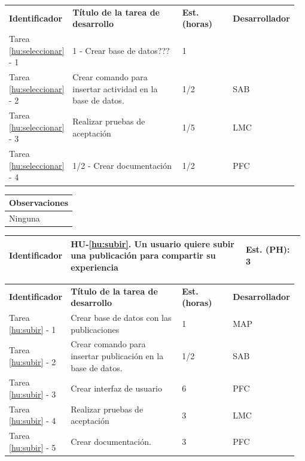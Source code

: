 \documentclass[11pt]{article}
\begin{document}
\begin{longtable}{p{0.18\linewidth}|p{0.4\linewidth}|p{0.18\linewidth}|p{0.2\linewidth}}
	\toprule
	\textbf{Identificador} & \textbf{Título de la tarea de desarrollo} & \textbf{Est. (horas)} & \textbf{Desarrollador} \\
        Tarea \ref{hu:seleccionar} - 1 & 1 - Crear base de datos??? & 1 & \\
        Tarea \ref{hu:seleccionar} - 2 & Crear comando para insertar actividad en la base de datos. & 1/2 & SAB\\
        Tarea \ref{hu:seleccionar} - 3 & Realizar pruebas de aceptación & 1/5 & LMC\\
        Tarea \ref{hu:seleccionar} - 4 & 1/2 - Crear documentación & 1/2 & PFC\\
	\bottomrule
\end{longtable}

\begin{longtable}{p{1.028\linewidth}}
	\textbf{Observaciones}\\
	\midrule
	Ninguna\\
	\bottomrule
	\bottomrule
\end{longtable}

\centering
\begin{longtable}{p{0.18\linewidth}|p{0.6\linewidth}|p{0.2\linewidth}}
	\toprule
	\toprule
	\textbf{Identificador} & \textbf{HU-\ref{hu:subir}}. Un usuario quiere subir una publicación para compartir su experiencia& \textbf{Est. (PH):} 3 \\
	
	\bottomrule
\end{longtable}

\begin{longtable}{p{0.18\linewidth}|p{0.4\linewidth}|p{0.18\linewidth}|p{0.2\linewidth}}
	\toprule
	\textbf{Identificador} & \textbf{Título de la tarea de desarrollo} & \textbf{Est. (horas)} & \textbf{Desarrollador} \\
        Tarea \ref{hu:subir} - 1 & Crear base de datos con las publicaciones & 1 & MAP\\
        Tarea \ref{hu:subir} - 2 & Crear comando para insertar publicación en la base de datos. & 1/2 & SAB \\
        Tarea \ref{hu:subir} - 3 & Crear interfaz de usuario & 6 & PFC\\
        Tarea \ref{hu:subir} - 4 & Realizar pruebas de aceptación & 3 & LMC\\
        Tarea \ref{hu:subir} - 5 & Crear documentación. & 3 & PFC\\
	\bottomrule
\end{longtable}
\end{document}
